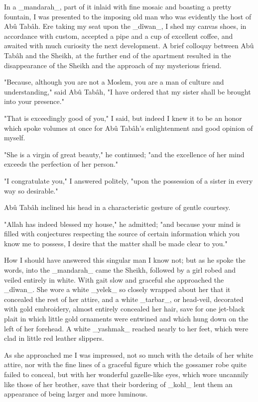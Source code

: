 In a _mandarah_, part of it inlaid with fine mosaic and boasting a
pretty fountain, I was presented to the imposing old man who was
evidently the host of Abû Tabâh. Ere taking my seat upon the _dîwan_,
I shed my canvas shoes, in accordance with custom, accepted a pipe and
a cup of excellent coffee, and awaited with much curiosity the next
development. A brief colloquy between Abû Tabâh and the Sheikh, at the
further end of the apartment resulted in the disappearance of the
Sheikh and the approach of my mysterious friend.

"Because, although you are not a Moslem, you are a man of culture and
understanding," said Abû Tabâh, "I have ordered that my sister shall
be brought into your presence."

"That is exceedingly good of you," I said, but indeed I knew it to be
an honor which spoke volumes at once for Abû Tabâh's enlightenment and
good opinion of myself.

"She is a virgin of great beauty," he continued; "and the excellence
of her mind exceeds the perfection of her person."

"I congratulate you," I answered politely, "upon the possession of a
sister in every way so desirable."

Abû Tabâh inclined his head in a characteristic gesture of gentle
courtesy.

"Allah has indeed blessed my house," he admitted; "and because your
mind is filled with conjectures respecting the source of certain
information which you know me to possess, I desire that the matter
shall be made clear to you."

How I should have answered this singular man I know not; but as he
spoke the words, into the _mandarah_ came the Sheikh, followed by a
girl robed and veiled entirely in white. With gait slow and graceful
she approached the _dîwan_. She wore a white _yelek_ so closely
wrapped about her that it concealed the rest of her attire, and a
white _tarbar_, or head-veil, decorated with gold embroidery, almost
entirely concealed her hair, save for one jet-black plait in which
little gold ornaments were entwined and which hung down on the left of
her forehead. A white _yashmak_ reached nearly to her feet, which were
clad in little red leather slippers.

As she approached me I was impressed, not so much with the details of
her white attire, nor with the fine lines of a graceful figure which
the gossamer robe quite failed to conceal, but with her wonderful
gazelle-like eyes, which wore uncannily like those of her brother,
save that their bordering of _kohl_ lent them an appearance of being
larger and more luminous.

